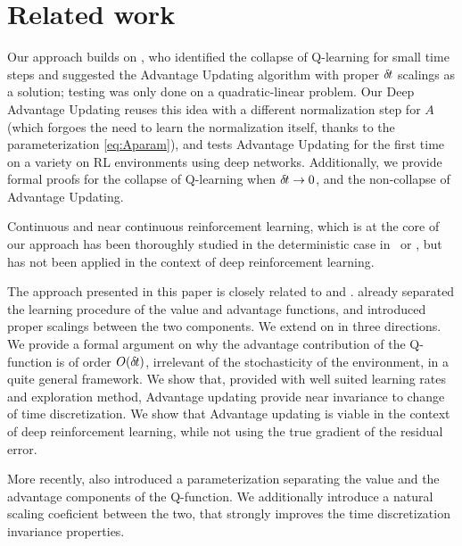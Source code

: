 \section{Related work}
\label{sec:related}

Our approach builds on \cite{adv_upd}, who identified the
collapse of Q-learning for small time steps and suggested the Advantage
Updating algorithm with proper ${\delta\hspace{-.1em}t}$ scalings as a solution; testing
was only done on a quadratic-linear problem. Our Deep Advantage Updating
reuses this idea with a different normalization step for $A$ (which
forgoes the need to learn the normalization itself, thanks to the
parameterization \eqref{eq:Aparam}), and tests Advantage Updating for the
first time on a variety on RL environments using deep networks.
Additionally, we provide formal proofs for the collapse
of Q-learning when ${\delta\hspace{-.1em}t}\to 0$, and the non-collapse of Advantage
Updating.


Continuous and near continuous reinforcement learning, which is at the core of
our approach has been thoroughly studied in the deterministic case
in~\cite{adv_upd} or \cite{cont_rl}, but has not been applied in the context of
deep reinforcement learning.

The approach presented in this paper is closely related to \cite{adv_upd} and
\cite{cont_rl}. \cite{adv_upd} already separated the learning procedure of the
value and advantage functions, and introduced proper scalings between the two
components. We extend on \cite{adv_upd} in three directions. We provide a
formal argument on why the advantage contribution of the Q-function is of order
$O({\delta\hspace{-.1em}t})$, irrelevant of the stochasticity of the environment, in a quite
general framework. We show that, provided with well suited learning rates and
exploration method, Advantage updating provide near invariance to change of time
discretization. We show that Advantage updating is viable in the context of deep
reinforcement learning, while not using the true gradient of the residual error.

More recently, \cite{dueling_nets} also introduced a parameterization separating
the value and the advantage components of the Q-function. We additionally
introduce a natural scaling coeficient between the two, that strongly improves
the time discretization invariance properties.

